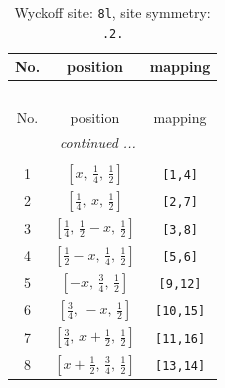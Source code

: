 \documentclass[fleqn,8pt]{jsarticle}
\begin{document}
\begin{longtable}{ccc}
\caption{Wyckoff site: {\tt 8l}, site symmetry: {\tt .2.}}
 \\
 \hline \hline
No. & position & mapping \\ \hline \endfirsthead

\multicolumn{2}{l}{\tablename\ \thetable{}} \\
 \hline \hline
No. & position & mapping \\ \hline \endhead

 \hline \hline
\multicolumn{2}{r}{\footnotesize\it continued ...} \\ \endfoot

 \hline \hline
\multicolumn{2}{r}{} \\ \endlastfoot

1 & $\left[ x,\, \frac{1}{4},\, \frac{1}{2} \right]$ & {\tt [1,4]} \\ \hline
2 & $\left[ \frac{1}{4},\, x,\, \frac{1}{2} \right]$ & {\tt [2,7]} \\ \hline
3 & $\left[ \frac{1}{4},\, \frac{1}{2} - x,\, \frac{1}{2} \right]$ & {\tt [3,8]} \\ \hline
4 & $\left[ \frac{1}{2} - x,\, \frac{1}{4},\, \frac{1}{2} \right]$ & {\tt [5,6]} \\ \hline
5 & $\left[ - x,\, \frac{3}{4},\, \frac{1}{2} \right]$ & {\tt [9,12]} \\ \hline
6 & $\left[ \frac{3}{4},\, - x,\, \frac{1}{2} \right]$ & {\tt [10,15]} \\ \hline
7 & $\left[ \frac{3}{4},\, x + \frac{1}{2},\, \frac{1}{2} \right]$ & {\tt [11,16]} \\ \hline
8 & $\left[ x + \frac{1}{2},\, \frac{3}{4},\, \frac{1}{2} \right]$ & {\tt [13,14]} \\
\end{longtable}
\renewcommand{\arraystretch}{1.2}
\end{document}
